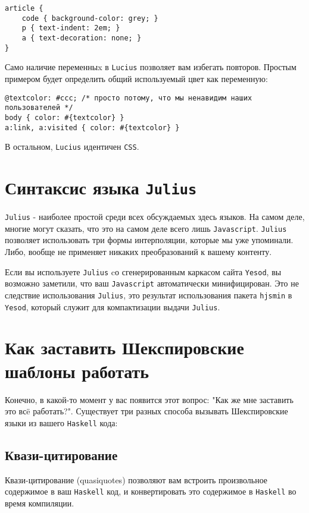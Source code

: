 \begin{lstlisting}
article {
    code { background-color: grey; }
    p { text-indent: 2em; }
    a { text-decoration: none; }
}
\end{lstlisting}

Само наличие переменныx в \texttt{Lucius} позволяет вам избегать повторов. Простым примером
будет определить общий используемый цвет как переменную:

\begin{lstlisting}
@textcolor: #ccc; /* просто потому, что мы ненавидим наших пользователей */
body { color: #{textcolor} }
a:link, a:visited { color: #{textcolor} }
\end{lstlisting}

В остальном, \texttt{Lucius} идентичен \texttt{CSS}.

\section{Синтаксис языка \texttt{Julius}}

\texttt{Julius} - наиболее простой среди всех обсуждаемых здесь языков. На самом деле, 
многие могут сказать, что это на самом деле всего лишь \texttt{Javascript}. \texttt{Julius}
позволяет использовать три формы интерполяции, которые мы уже упоминали.
Либо, вообще не применяет никаких преобразований к вашему контенту.

Если вы используете \texttt{Julius} cо сгенерированным каркасом сайта \texttt{Yesod}, вы возможно заметили, что ваш
\texttt{Javascript} автоматически минифицирован. Это не следствие использования \texttt{Julius}, это
результат использования пакета \lstinline!hjsmin! в \texttt{Yesod}, который служит для компактизации
выдачи \texttt{Julius}.

\section{Как заставить Шекспировские шаблоны работать}

Конечно, в какой-то момент у вас появится этот вопрос: "Как же мне заставить это
всë работать?". Существует три разных способа вызывать Шекспировские языки 
из вашего \texttt{Haskell} кода:

\subsection{Квази-цитирование}
Квази-цитирование (quasiquotes) позволяют вам встроить произвольное содержимое в ваш \texttt{Haskell} код, и
конвертировать это содержимое в \texttt{Haskell} во время компиляции.

